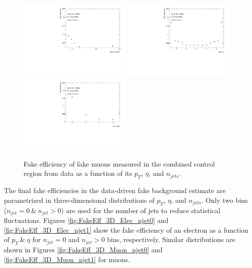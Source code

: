 \begin{figure}[!htb]
        \begin{center}
        \includegraphics[width = 0.49\textwidth]{figures/Analysis/Background/Fake_Eff_Muon_pt_1D.pdf}
        \includegraphics[width = 0.49\textwidth]{figures/Analysis/Background/Fake_Eff_Muon_eta_1D.pdf} \\
        \includegraphics[width = 0.49\textwidth]{figures/Analysis/Background/Fake_Eff_Muon_jet_n_1D.pdf} 
        \end{center}
    \caption{Fake efficiency of fake muons measured in the combined control region from data as a function of its $p_{T}$, $\eta$, and $n_{jets}$. \label{fig:FakeEff_1D_Muon}}
\end{figure}

The final fake efficiencies in the data-driven fake background estimate are parametrized in three-dimensional distributions of $p_{T}$, $\eta$, and $n_{jets}$. Only two bins ($n_{jet}=0 ~\& ~ n_{jet} > 0$) are used for the number of jets to reduce statistical fluctuations. Figures \ref{fig:FakeEff_3D_Elec_njet0} and \ref{fig:FakeEff_3D_Elec_njet1} show the fake efficiency of an electron as a function of $p_{T} ~\&~ \eta$ for $n_{jet}=0 $ and $n_{jet}>0 $ bins, respectively. Similar distributions are shown in Figures \ref{fig:FakeEff_3D_Muon_njet0} and \ref{fig:FakeEff_3D_Muon_njet1} for muons.  

